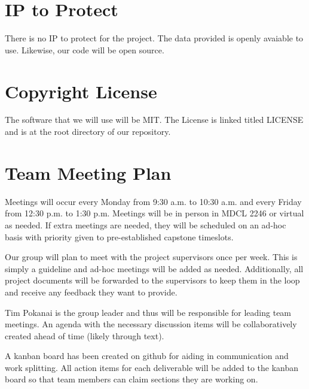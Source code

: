 \documentclass{article}
\begin{document}
\section{IP to Protect}

\par{There is no IP to protect for the project. The data provided is openly avaiable to use. Likewise, our code will be open source.}


\section{Copyright License}

\par{The software that we will use will be MIT. The License is linked titled LICENSE and is at the root directory of our repository.}


\section{Team Meeting Plan}





\par{\indent Meetings will occur every Monday from 9:30 a.m. to 10:30 a.m. and every Friday from 12:30 p.m. to 1:30 p.m. Meetings will
be in person in MDCL 2246 or virtual as needed. If extra meetings are needed, they will be scheduled on an ad-hoc basis with priority given to pre-established capstone timeslots.

Our group will plan to meet with the project supervisors once per week. This is simply a guideline and ad-hoc meetings
will be added as needed. Additionally, all project documents will be forwarded to the supervisors to keep them in the loop and receive any feedback they want to provide.

Tim Pokanai is the group leader and thus will be responsible for leading team meetings. An agenda with the necessary 
discussion items will be collaboratively created ahead of time (likely through text).

A kanban board has been created on github for aiding in communication and work splitting. All action items for each deliverable will
be added to the kanban board so that team members can claim sections they are working on.
}
\end{document}
